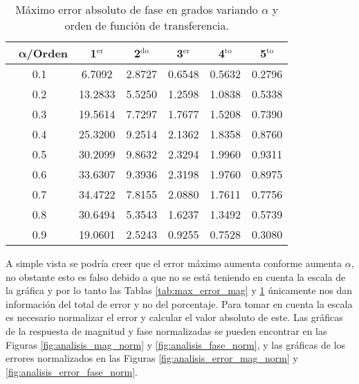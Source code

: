 	\begin{table}[!hbp]                                 
	\centering            
	\caption{Máximo error absoluto de fase en grados variando $\alpha$ y orden de función de transferencia.}                           
	\label{tab:max_error_fase}                               
		\begin{tabular}{cccccc}
			\hline                                             
			$\,\,\,\,\bm{\alpha}$\textbf{/Orden} & \textbf{1$^{\mathrm{er}}$} & \textbf{2$^{\mathrm{do}}$} & \textbf{3$^{\mathrm{er}}$} & \textbf{4$^{\mathrm{to}}$} & \textbf{5$^{\mathrm{to}}$} \\                     
			\hline                                             
			0.1 & 6.7092 & 2.8727 & 0.6548 & 0.5632 & 0.2796 \\ 
			                                             
			0.2 & 13.2833 & 5.5250 & 1.2598 & 1.0838 & 0.5338 \\
			                                            
			0.3 & 19.5614 & 7.7297 & 1.7677 & 1.5208 & 0.7390 \\
			                                              
			0.4 & 25.3200 & 9.2514 & 2.1362 & 1.8358 & 0.8760 \\
			                                            
			0.5 & 30.2099 & 9.8632 & 2.3294 & 1.9960 & 0.9311 \\
			                                             
			0.6 & 33.6307 & 9.3936 & 2.3198 & 1.9760 & 0.8975 \\
			                                             
			0.7 & 34.4722 & 7.8155 & 2.0880 & 1.7611 & 0.7756 \\
			                                             
			0.8 & 30.6494 & 5.3543 & 1.6237 & 1.3492 & 0.5739 \\
			                                             
			0.9 & 19.0601 & 2.5243 & 0.9255 & 0.7528 & 0.3080 \\
			\hline                                             
		\end{tabular}                                                             
	\end{table}

	A simple vista se podría creer que el error máximo aumenta conforme aumenta $\alpha$, no obstante esto es falso debido a que no se está teniendo en cuenta la escala de la gráfica y por lo tanto las Tablas \ref{tab:max_error_mag} y \ref{tab:max_error_fase} únicamente nos dan información del total de error y no del porcentaje. Para tomar en cuenta la escala es necesario normalizar el error y calcular el valor absoluto de este. Las gráficas de la respuesta de magnitud y fase normalizadas se pueden encontrar en las Figuras \ref{fig:analisis_mag_norm} y \ref{fig:analisis_fase_norm}, y las gráficas de los errores normalizados en las Figuras \ref{fig:analisis_error_mag_norm} y \ref{fig:analisis_error_fase_norm}.
	
